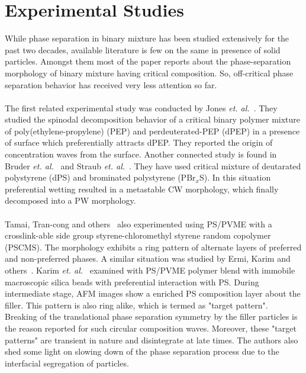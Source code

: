\documentclass[12pt]{iiscthes}
\theoremstyle{definition}
\theoremstyle{definition}
\theoremstyle{remark}
\begin{document}
\section{Experimental Studies}
While phase separation in binary mixture has been studied extensively for the past two decades, available literature is few on the same in presence of solid particles. Amongst them most of the paper reports about the phase-separation morphology of binary mixture having critical composition. So, off-critical phase separation behavior has received very less attention so far.
\\ \\
The first related experimental study was conducted by Jones \emph{et. al.}~\cite{Puri}. They studied the spinodal decomposition behavior of a critical binary polymer mixture of poly(ethylene-propylene) (PEP) and perdeuterated-PEP (dPEP) in a presence of surface which preferentially attracts dPEP. They reported the origin of concentration waves from the surface. Another connected study is found in Bruder \emph{et. al.}~\cite{Puri} and Straub \emph{et. al.}~\cite{Puri}. They have used critical mixture of deutarated polystyrene (dPS) and brominated polystyrene (PBr$_x$S). In this situation preferential wetting resulted in a metastable CW morphology, which finally decomposed into a PW morphology. 
\\ \\
Tamai, Tran-cong and others~\cite{Lee} also experimented using PS/PVME with a crosslink-able side group styrene-chloromethyl styrene random copolymer (PSCMS). The morphology exhibits a ring pattern of alternate layers of preferred and non-preferred phases. A similar situation was studied by Ermi, Karim and others~\cite{Lee}. Karim \emph{et. al.}~\cite{Karim} examined with PS/PVME polymer blend with immobile macroscopic silica beads with preferential interaction with PS. During intermediate stage, AFM images show a enriched PS composition layer about the filler. This pattern is also ring alike, which is termed as "target pattern". Breaking of the translational phase separation symmetry by the filler particles is the reason reported for such circular composition waves. Moreover, these "target patterns" are transient in nature and disintegrate at late times. The authors also shed some light on slowing down of the phase separation process due to the interfacial segregation of particles.     
\\ \\
\end{document}
